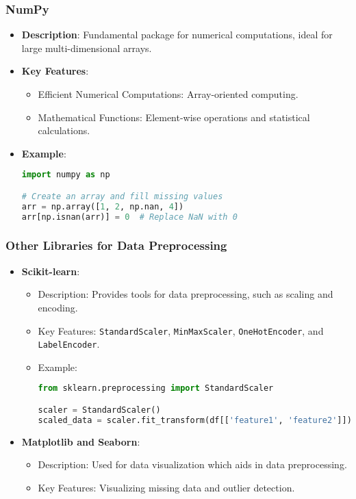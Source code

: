 \documentclass{beamer}
\begin{document}
\begin{frame}[fragile]
    \frametitle{NumPy}
    \begin{itemize}
        \item \textbf{Description}: Fundamental package for numerical computations, ideal for large multi-dimensional arrays.
        \item \textbf{Key Features}:
            \begin{itemize}
                \item Efficient Numerical Computations: Array-oriented computing.
                \item Mathematical Functions: Element-wise operations and statistical calculations.
            \end{itemize}
        \item \textbf{Example}:
            \begin{lstlisting}[language=Python]
import numpy as np

# Create an array and fill missing values
arr = np.array([1, 2, np.nan, 4])
arr[np.isnan(arr)] = 0  # Replace NaN with 0
            \end{lstlisting}
    \end{itemize}
\end{frame}

\begin{frame}[fragile]
    \frametitle{Other Libraries for Data Preprocessing}
    \begin{itemize}
        \item \textbf{Scikit-learn}:
            \begin{itemize}
                \item Description: Provides tools for data preprocessing, such as scaling and encoding.
                \item Key Features: \texttt{StandardScaler}, \texttt{MinMaxScaler}, \texttt{OneHotEncoder}, and \texttt{LabelEncoder}.
                \item Example:
                    \begin{lstlisting}[language=Python]
from sklearn.preprocessing import StandardScaler

scaler = StandardScaler()
scaled_data = scaler.fit_transform(df[['feature1', 'feature2']])
                    \end{lstlisting}
            \end{itemize}
        
        \item \textbf{Matplotlib and Seaborn}:
            \begin{itemize}
                \item Description: Used for data visualization which aids in data preprocessing.
                \item Key Features: Visualizing missing data and outlier detection.
            \end{itemize}
    \end{itemize}
\end{frame}
\end{document}
